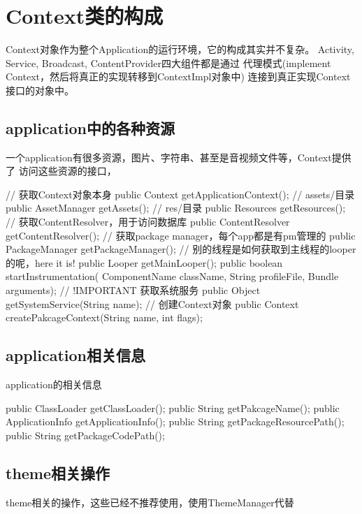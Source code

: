 
\section[Context类的构成]{Context类的构成}
Context对象作为整个Application的运行环境，它的构成其实并不复杂。
Activity, Service, Broadcast, ContentProvider四大组件都是通过
代理模式(implement Context，然后将真正的实现转移到ContextImpl对象中)
连接到真正实现Context接口的对象中。

\subsection[application中的各种资源]{application中的各种资源}
一个application有很多资源，图片、字符串、甚至是音视频文件等，Context提供了
访问这些资源的接口，

\begin{javacode}
// 获取Context对象本身
public Context getApplicationContext();
// assets/目录
public AssetManager getAssets();
// res/目录
public Resources getResources();
// 获取ContentResolver，用于访问数据库
public ContentResolver getContentResolver();
// 获取package manager，每个app都是有pm管理的
public PackageManager getPackageManager();
// 别的线程是如何获取到主线程的looper的呢，here it is!
public Looper getMainLooper();
public boolean startInstrumentation(
             ComponentName className,
             String profileFile,
             Bundle arguments);
// !IMPORTANT 获取系统服务
public Object getSystemService(String name);
// 创建Context对象
public Context createPakcageContext(String name, int flags);
\end{javacode}

\subsection[application相关信息]{application相关信息}
application的相关信息

\begin{javacode}
public ClassLoader getClassLoader();
public String getPakcageName();
public ApplicationInfo getApplicationInfo();
public String getPackageResourcePath();
public String getPackageCodePath();
\end{javacode}

\subsection[theme相关操作]{theme相关操作}
theme相关的操作，这些已经不推荐使用，使用ThemeManager代替

